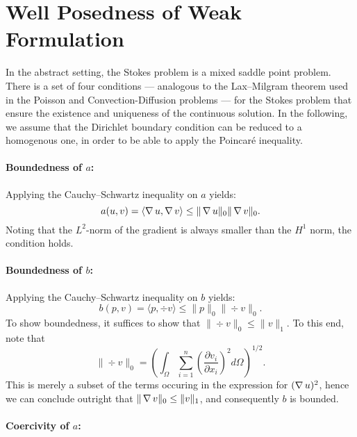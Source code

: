 \section{Well Posedness of Weak Formulation}

In the abstract setting, the Stokes problem is a mixed saddle point problem.
There is a set of four conditions --- analogous to the Lax--Milgram theorem
used in the Poisson and Convection-Diffusion problems --- for the Stokes
problem that ensure the existence and uniqueness of the continuous solution.
In the following, we assume that the Dirichlet boundary condition can be
reduced to a homogenous one, in order to be able to apply the Poincar\'e
inequality.

\paragraph{Boundedness of \(a\):}

Applying the Cauchy--Schwartz inequality on \( a \) yields:
\begin{equation}
    a(u, v) = \langle \operatorname{\mathop{}\!\nabla} u, \operatorname{\mathop{}\!\nabla} v \rangle \leq \|\operatorname{\mathop{}\!\nabla} u\|_0 \| \operatorname{\mathop{}\!\nabla} v\|_0.
\end{equation}
Noting that the \( L^2\)-norm of the gradient is always smaller than the \( H^1
\) norm, the condition holds. 

\paragraph{Boundedness of \(b \):}

Applying the Cauchy--Schwartz inequality on \( b \) yields:
\begin{equation}
    b(p, v) = \langle p, \div v \rangle \leq \| p \|_0 \|\div v\|_0.
\end{equation}
To show boundedness, it suffices to show that \(\| \div v \|_0 \leq \| v \|_1
\). To this end, note that 
\begin{equation}
    \| \div v \|_0 = \left( \int_\Omega \sum^{n}_{i=1} \left(\frac{\partial
    v_i}{\partial x_i}\right)^2 d\Omega \right)^{1/2}.
\end{equation}
This is merely a subset of the terms occuring in the expression for \( (\operatorname{\mathop{}\!\nabla}
u)^2 \), hence we can conclude outright that \( \| \operatorname{\mathop{}\!\nabla} v \|_0 \leq \| v\|_1
\), and consequently \(b \) is bounded.

\paragraph{Coercivity of \( a \):}

